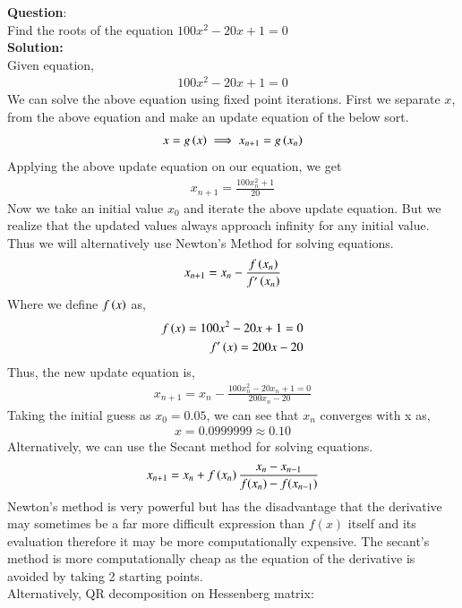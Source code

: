 \documentclass[journal]{IEEEtran}
\begin{document}
	
\textbf{Question}:\\
Find the roots of the equation \( 100x^2-20x+1=0 \)
\\
\textbf{Solution: }\\
Given equation,
\begin{align}
100x^2-20x+1=0
\end{align}
We can solve the above equation using fixed point iterations. First we separate $x$, from the above equation and make an update equation of the below sort.
\begin{align}
	x = g\left(x\right) \implies x_{n+1} = g\left(x_n\right)
\end{align}
Applying the above update equation on our equation, we get
\begin{align}
	x_{n+1} = 	\frac{100x_n^2+1}{20}
\end{align}
Now we take an initial value $x_0$ and iterate the above update equation. But we realize that the updated values always approach infinity for any initial value. \\
Thus we will alternatively use Newton's Method for solving equations.
\begin{align}
	x_{n+1} = x_n - \frac{f\left(x_n\right)}{f^{\prime}\left(x_n\right)} 
\end{align}
Where we define $f\left(x\right)$ as, 
\begin{align}
	f\left(x\right) = 100x^2-20x+1=0 \\
	f^{\prime}\left(x\right) = 200x-20 
\end{align}
Thus, the new update equation is, 
\begin{align}
	x_{n+1} = x_n - \frac{100x_n^2-20x_n+1=0}{200x_n-20 } 
\end{align}
Taking the initial guess as $x_0 = 0.05$, we can see that $x_n$ converges with x as,
\begin{align}
	x = 0.0999999 \approx 0.10
\end{align}
Alternatively, we can use the Secant method for solving equations.
\begin{align}
	x_{n+1} = x_n + f\left(x_n\right)\frac{x_{n} -  x_{n-1}}{f(x_{n}) -  f(x_{n-1})}
\end{align}
Newton's method is very powerful but has the disadvantage that the derivative may sometimes be a far more difficult expression than \(f(x)\) itself and its evaluation therefore it may be more computationally expensive. The secant's method is more computationally cheap as the equation of the derivative is avoided by taking 2 starting points.\\
Alternatively, QR decomposition on Hessenberg matrix:\\
\end{document}
